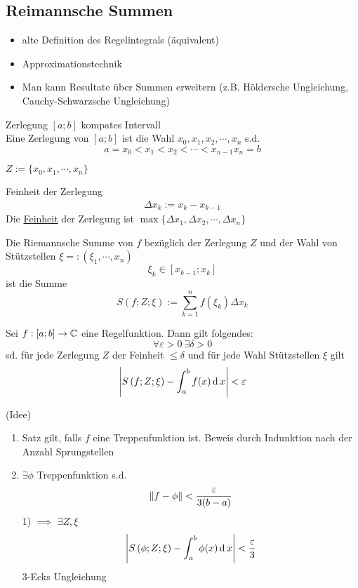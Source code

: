 \subsection{Reimannsche Summen}
\begin{itemize}
  \item alte Definition des Regelintegrals (äquivalent)
  \item Approximationstechnik
  \item Man kann Resultate über Summen erweitern (z.B. Höldersche Ungleichung, Cauchy-Schwarzsche Ungleichung)
\end{itemize}
\begin{Def}{Zerlegung}
  $[a;b]$ kompates Intervall\\
  Eine Zerlegung von $[a;b]$ ist die Wahl $x_0,x_1,x_2,\cdots,x_n$ s.d.
  \[a=x_0<x_1<x_2<\cdots<x_{n-1}x_n=b\]
\end{Def}
\begin{Not}
  $Z:=\{x_0,x_1,\cdots,x_n\}$
\end{Not}
\begin{Def}{Feinheit der Zerlegung}
  \begin{align*}
    \Delta x_k:=x_k -x_{k-1}
  \end{align*}
  Die \underline{Feinheit} der Zerlegung ist $\max \{\Delta x_1, \Delta x_2, \cdots , \Delta x_n\}$
\end{Def}
\begin{Def}
  Die Riemannsche Summe von $f$ bezüglich der Zerlegung $Z$ und der Wahl von Stützstellen $\xi=:\left( \xi_1,\cdots,x_n \right)$
  \[\xi_k\in \left[ x_{k-1};x_k \right]\]
  ist die Summe
  \[S(f;Z;\xi):=\sum^n_{k=1}f\left( \xi_k \right)\Delta x_k\]
\end{Def}
\begin{Sat}
  Sei $f:\left[ a;b \right]\to \mathbb{C}$ eine Regelfunktion. Dann gilt folgendes:
  \[\forall \varepsilon>0\ \exists \delta>0\]
  sd. für jede Zerlegung $Z$ der Feinheit $\leq \delta$ und für jede Wahl Stützstellen $\xi$ gilt
  \[\left| S\left( f;Z;\xi \right)-\int^b_af(x)\operatorname{d} x \right|<\varepsilon\]
\end{Sat}
\begin{Bew}
  (Idee)
  \begin{enumerate}
    \item Satz gilt, falls $f$ eine Treppenfunktion ist. Beweis durch Indunktion nach der Anzahl Sprungstellen
    \item $\exists \phi$ Treppenfunktion s.d.
      \[\left\| f-\phi \right\|<\frac{\varepsilon}{3(b-a)}\]
      1) $\implies$ $\exists Z,\xi$
      \[\left| S\left(\phi;Z;\xi\right) -\int^b_a\phi(x)\operatorname{d} x \right|<\frac{\varepsilon}{3}\]
      3-Ecks Ungleichung
  \end{enumerate}
\end{Bew}

